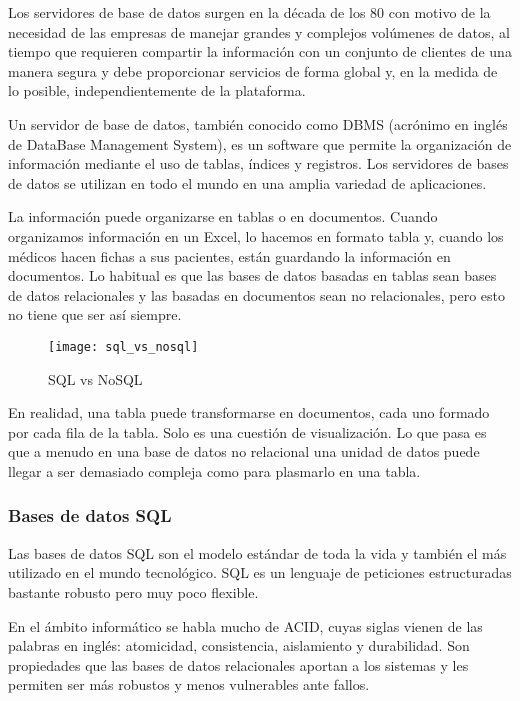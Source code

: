 Los servidores de base de datos surgen en la década de los 80 con motivo de la necesidad de las empresas de manejar grandes y complejos volúmenes de datos, al tiempo que requieren compartir la información con un conjunto de clientes de una manera segura y debe proporcionar servicios de forma global y, en la medida de lo posible, independientemente de la plataforma.

Un servidor de base de datos, también conocido como DBMS (acrónimo en inglés de DataBase Management System), es un software que permite la organización de información mediante el uso de tablas, índices y registros. Los servidores de bases de datos se utilizan en todo el mundo en una amplia variedad de aplicaciones.

La información puede organizarse en tablas o en documentos. Cuando organizamos información en un Excel, lo hacemos en formato tabla y, cuando los médicos hacen fichas a sus pacientes, están guardando la información en documentos. Lo habitual es que las bases de datos basadas en tablas sean bases de datos relacionales y las basadas en documentos sean no relacionales, pero esto no tiene que ser así siempre.

\begin{figure}[htp!]
  \centering
  \texttt{[image: sql\_vs\_nosql]}
  \caption{SQL vs NoSQL}
  \label{fig:sql_vs_nosql}
\end{figure}

En realidad, una tabla puede transformarse en documentos, cada uno formado por cada fila de la tabla. Solo es una cuestión de visualización. Lo que pasa es que a menudo en una base de datos no relacional una unidad de datos puede llegar a ser demasiado compleja como para plasmarlo en una tabla.

\subsubsection{Bases de datos SQL}

Las bases de datos SQL son el modelo estándar de toda la vida y también el más utilizado en el mundo tecnológico. SQL es un lenguaje de peticiones estructuradas bastante robusto pero muy poco flexible.

En el ámbito informático se habla mucho de ACID, cuyas siglas vienen de las palabras en inglés: atomicidad, consistencia, aislamiento y durabilidad. Son propiedades que las bases de datos relacionales aportan a los sistemas y les permiten ser más robustos y menos vulnerables ante fallos.

